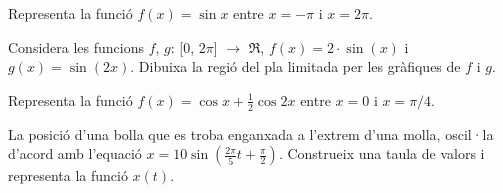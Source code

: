 \begin{mylist}
	\exer Representa la funció $f(x)=\sin x$  entre $x=-\pi$ i $x=2\pi$.
	
	\exer Considera les funcions $f$, $g$: [0, $2\pi$] $\rightarrow$ $\Re$, $f(x)=2\cdot  \sin(x)$  i  $g(x)=\sin(2x).$ Dibuixa la regió del pla limitada per les gràfiques de $f$ i $g$.

\exer Representa la funció $f(x)=\cos x + \frac{1}{2} \cos 2x$ entre $x=0$ i $x=\pi/4$.

\exer La posició d'una bolla que es troba enganxada a l'extrem d'una molla, oscil·la d'acord amb l'equació $x=10\sin\left(\frac{2\pi }{5}t + \frac{\pi}{2}\right)$. Construeix una taula de valors i representa la funció $x(t)$.
\end{mylist}

